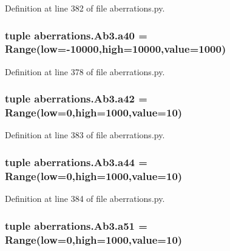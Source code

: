 Definition at line 382 of file aberrations.\-py.

\hypertarget{classaberrations_1_1_ab3_a4ce0fbb1fbe9365ea1e480a3866dbd51}{
\subsubsection[{a40}]{\setlength{\rightskip}{0pt plus 5cm}tuple aberrations.\-Ab3.\-a40 = Range(low=-\/10000,high=10000,{\bf value}=1000)\hspace{0.3cm}{\ttfamily [static]}}}\label{classaberrations_1_1_ab3_a4ce0fbb1fbe9365ea1e480a3866dbd51}


Definition at line 378 of file aberrations.\-py.

\hypertarget{classaberrations_1_1_ab3_abda80a3fc204ebf86463a47c12934987}{
\subsubsection[{a42}]{\setlength{\rightskip}{0pt plus 5cm}tuple aberrations.\-Ab3.\-a42 = Range(low=0,high=1000,{\bf value}=10)\hspace{0.3cm}{\ttfamily [static]}}}\label{classaberrations_1_1_ab3_abda80a3fc204ebf86463a47c12934987}


Definition at line 383 of file aberrations.\-py.

\hypertarget{classaberrations_1_1_ab3_acd01b2dcdb096fd7e5274d1393d58eec}{
\subsubsection[{a44}]{\setlength{\rightskip}{0pt plus 5cm}tuple aberrations.\-Ab3.\-a44 = Range(low=0,high=1000,{\bf value}=10)\hspace{0.3cm}{\ttfamily [static]}}}\label{classaberrations_1_1_ab3_acd01b2dcdb096fd7e5274d1393d58eec}


Definition at line 384 of file aberrations.\-py.

\hypertarget{classaberrations_1_1_ab3_afe66278f105e9740c36aa3c3870e2820}{
\subsubsection[{a51}]{\setlength{\rightskip}{0pt plus 5cm}tuple aberrations.\-Ab3.\-a51 = Range(low=0,high=1000,{\bf value}=10)\hspace{0.3cm}{\ttfamily [static]}}}\label{classaberrations_1_1_ab3_afe66278f105e9740c36aa3c3870e2820}


